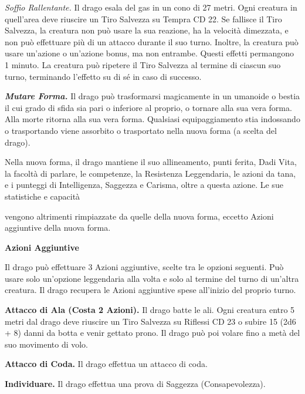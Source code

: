 \begin{multicols}{2}
\emph{Soffio Rallentante.} Il drago esala del gas in un cono di 27 metri. Ogni creatura in quell'area deve riuscire un Tiro Salvezza su Tempra CD 22. Se fallisce il Tiro Salvezza, la creatura non può usare la sua reazione, ha la velocità dimezzata, e non può effettuare più di un attacco durante il suo turno. Inoltre, la creatura può usare un'azione o un'azione bonus, ma non entrambe. Questi effetti permangono 1 minuto. La creatura può ripetere il Tiro Salvezza al termine di ciascun suo turno, terminando l'effetto su di sé in caso di successo.

\emph{\textbf{Mutare Forma.}} Il drago può trasformarsi magicamente in un umanoide o bestia il cui grado di sfida sia pari o inferiore al proprio, o tornare alla sua vera forma. Alla morte ritorna alla sua vera forma. Qualsiasi equipaggiamento stia indossando o trasportando viene assorbito o trasportato nella nuova forma (a scelta del drago).

Nella nuova forma, il drago mantiene il suo allineamento, punti ferita, Dadi Vita, la facoltà di parlare, le competenze, la Resistenza Leggendaria, le azioni da tana, e i punteggi di Intelligenza, Saggezza e Carisma, oltre a questa azione. Le sue statistiche e capacità

vengono altrimenti rimpiazzate da quelle della nuova forma, eccetto Azioni aggiuntive della nuova forma.

\textbf{Azioni Aggiuntive}

Il drago può effettuare 3 Azioni aggiuntive, scelte tra le opzioni seguenti. Può usare solo un'opzione leggendaria alla volta e solo al termine del turno di un'altra creatura. Il drago recupera le Azioni aggiuntive spese all'inizio del proprio turno.

\textbf{Attacco di Ala (Costa 2 Azioni).} Il drago batte le ali. Ogni creatura entro 5 metri dal drago deve riuscire un Tiro Salvezza su Riflessi CD 23 o subire 15 (2d6 + 8) danni da botta e venir gettato prono. Il drago può poi volare fino a metà del suo movimento di volo.

\textbf{Attacco di Coda.} Il drago effettua un attacco di coda.

\textbf{Individuare.} Il drago effettua una prova di Saggezza (Consapevolezza).


\end{multicols}
